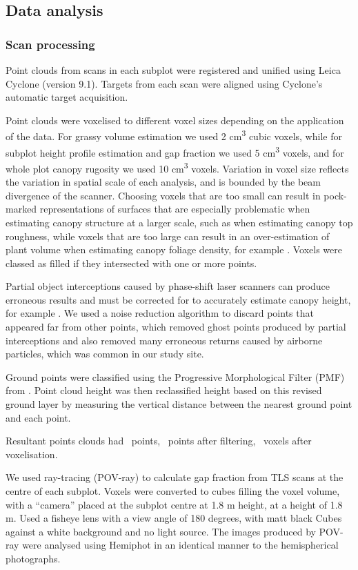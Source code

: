 \documentclass[11pt,a4paper]{article}
\begin{document}
\subsection{Data analysis}

\subsubsection{Scan processing}

Point clouds from scans in each subplot were registered and unified using Leica Cyclone (version 9.1). Targets from each scan were aligned using Cyclone's automatic target acquisition. 

Point clouds were voxelised to different voxel sizes depending on the application of the data. For grassy volume estimation we used 2 cm\textsuperscript{3} cubic voxels, while for subplot height profile estimation and gap fraction we used 5 cm\textsuperscript{3} voxels, and for whole plot canopy rugosity we used 10 cm\textsuperscript{3} voxels. Variation in voxel size reflects the variation in spatial scale of each analysis, and is bounded by the beam divergence of the scanner. Choosing voxels that are too small can result in pock-marked representations of surfaces that are especially problematic when estimating canopy structure at a larger scale, such as when estimating canopy top roughness, while voxels that are too large can result in an over-estimation of plant volume when estimating canopy foliage density, for example \citep{Cifuentes2014}. Voxels were classed as filled if they intersected with one or more points.

Partial object interceptions caused by phase-shift laser scanners can produce erroneous results and must be corrected for to accurately estimate canopy height, for example \citep{}. We used a noise reduction algorithm to discard points that appeared far from other points, which removed ghost points produced by partial interceptions and also removed many erroneous returns caused by airborne particles, which was common in our study site.

Ground points were classified using the Progressive Morphological Filter (PMF) from \citep{Zhang2003}. Point cloud height was then reclassified height based on this revised ground layer by measuring the vertical distance between the nearest ground point and each point.

Resultant points clouds had ~points, ~points after filtering, ~voxels after voxelisation.

We used ray-tracing (POV-ray) to calculate gap fraction from TLS scans at the centre of each subplot. Voxels were converted to cubes filling the voxel volume, with a ``camera'' placed at the subplot centre at 1.8 m height, at a height of 1.8 m. Used a fisheye lens with a view angle of 180 degrees, with matt black Cubes against a white background and no light source. The images produced by POV-ray were analysed using Hemiphot in an identical manner to the hemispherical photographs.
\end{document}
